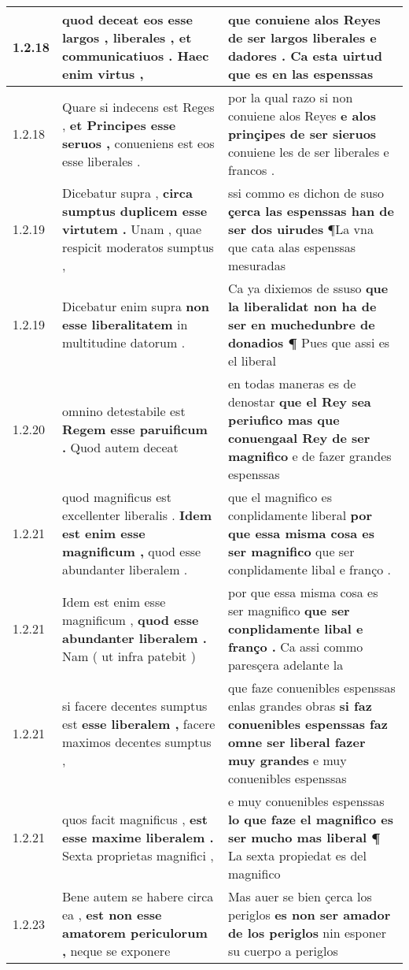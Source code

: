\begin{tabular}{|p{1cm}|p{6.5cm}|p{6.5cm}|}
1.2.18 & quod deceat \textbf{ eos esse largos , liberales , et communicatiuos . } Haec enim virtus , & que conuiene alos Reyes \textbf{ de ser largos liberales e dadores . } Ca esta uirtud que es en las espenssas \\\hline
1.2.18 & Quare si indecens est Reges , \textbf{ et Principes esse seruos , } conueniens est eos esse liberales . & por la qual razo si non conuiene alos Reyes \textbf{ e alos prinçipes de ser sieruos } conuiene les de ser liberales e francos . \\\hline
1.2.19 & Dicebatur supra , \textbf{ circa sumptus duplicem esse virtutem . } Unam , quae respicit moderatos sumptus , & ssi commo es dichon de suso \textbf{ çerca las espenssas han de ser dos uirudes } ¶La vna que cata alas espenssas mesuradas \\\hline
1.2.19 & Dicebatur enim supra \textbf{ non esse liberalitatem } in multitudine datorum . & Ca ya dixiemos de ssuso \textbf{ que la liberalidat non ha de ser en muchedunbre de donadios ¶ } Pues que assi es el liberal \\\hline
1.2.20 & omnino detestabile est \textbf{ Regem esse paruificum . } Quod autem deceat & en todas maneras es de denostar \textbf{ que el Rey sea periufico mas que conuengaal Rey de ser magnifico } e de fazer grandes espenssas \\\hline
1.2.21 & quod magnificus est excellenter liberalis . \textbf{ Idem est enim esse magnificum , } quod esse abundanter liberalem . & que el magnifico es conplidamente liberal \textbf{ por que essa misma cosa es ser magnifico } que ser conplidamente libal e franço . \\\hline
1.2.21 & Idem est enim esse magnificum , \textbf{ quod esse abundanter liberalem . } Nam ( ut infra patebit ) & por que essa misma cosa es ser magnifico \textbf{ que ser conplidamente libal e franço . } Ca assi commo paresçera adelante la \\\hline
1.2.21 & si facere decentes sumptus est \textbf{ esse liberalem , } facere maximos decentes sumptus , & que faze conuenibles espenssas enlas grandes obras \textbf{ si faz conuenibles espenssas faz omne ser liberal fazer muy grandes } e muy conuenibles espenssas \\\hline
1.2.21 & quos facit magnificus , \textbf{ est esse maxime liberalem . } Sexta proprietas magnifici , & e muy conuenibles espenssas \textbf{ lo que faze el magnifico es ser mucho mas liberal ¶ } La sexta propiedat es del magnifico \\\hline
1.2.23 & Bene autem se habere circa ea , \textbf{ est non esse amatorem periculorum , } neque se exponere & Mas auer se bien çerca los periglos \textbf{ es non ser amador de los periglos } nin esponer su cuerpo a periglos \\\hline

\end{tabular}
